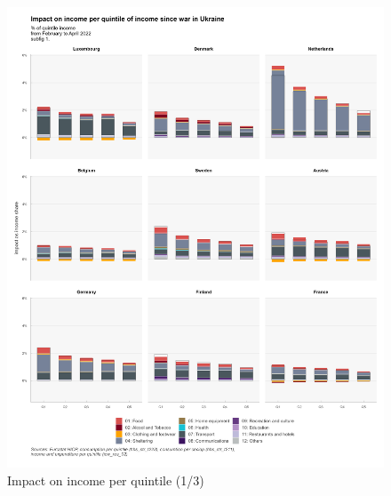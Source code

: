 \documentclass[
  9pt,
  a4paper,
  DIV=11,
  numbers=noendperiod]{scrartcl}
\begin{document}
\begin{figure}

\caption{Impact on income per quintile (1/3)}

{\centering \includegraphics[width=16cm,height=\textheight]{../svg/coicop_l1_wiu_1.png}

}

\end{figure}
\end{document}
